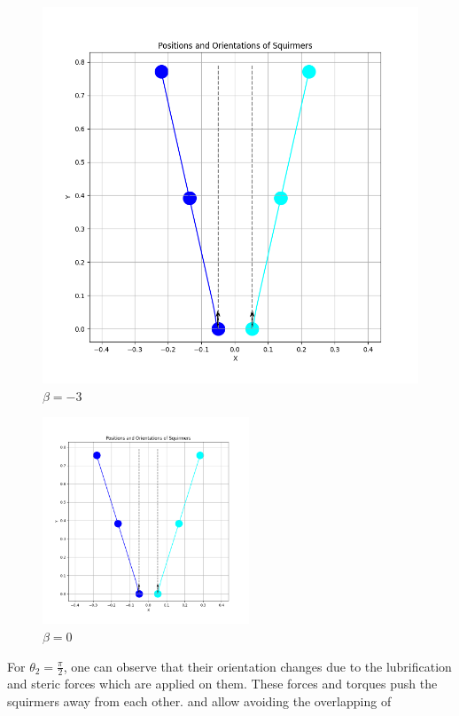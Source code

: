\documentclass{article}
\begin{document}
\begin{figure}[H]
\begin{minipage}{0.49\textwidth}
        \includegraphics[width=1.1\textwidth]{graphs/simulations/sim_sq_sq/betam3/pi_2_.png}
        \caption{\footnotesize $\beta = -3$}
    \end{minipage}
\end{figure}
\begin{figure}[H]
    \centering
    \includegraphics[width=0.55\textwidth]{graphs/simulations/sim_sq_sq/beta0/pi_2_.png}
    \caption{\footnotesize $\beta = 0$}
 \end{figure}
For $\theta_2 = \frac{\pi}{2}$, one can observe that their orientation changes due to the lubrification and steric forces which are applied on them. 
These forces and torques push the squirmers away from each other. and allow avoiding the overlapping of
\end{document}
